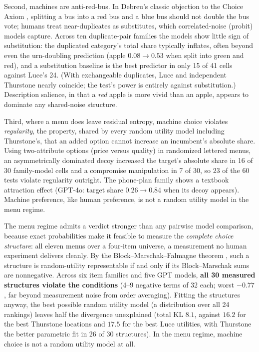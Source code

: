 \documentclass[11pt]{article}
\begin{document}
Second, machines are anti-red-bus. In Debreu's classic objection to the
Choice Axiom \cite{debreu1960}, splitting a bus into a red bus and a
blue bus should not double the bus vote; humans treat near-duplicates as
substitutes, which correlated-noise (probit) models capture. Across ten
duplicate-pair families the models show little sign of substitution:
the duplicated category's total share typically inflates, often beyond
even the urn-doubling prediction (apple $0.08 \to 0.53$ when split into
green and red), and a substitution baseline is the best predictor in
only 15 of 41 cells against Luce's 24. (With exchangeable duplicates,
Luce and independent Thurstone nearly coincide; the test's power is
entirely against substitution.) Description salience, in that a
\emph{red} apple is more vivid than an apple, appears to dominate any
shared-noise structure.

Third, where a menu does leave residual entropy, machine choice violates
\emph{regularity}, the property, shared by every random utility model
including Thurstone's, that an added option cannot increase an incumbent's
absolute share. Using two-attribute options (price versus quality) in
randomized lettered menus, an asymmetrically dominated decoy
\cite{huber1982} increased the target's absolute share in 16 of 30
family-model cells and a compromise manipulation \cite{simonson1989} in 7 of
30, so 23 of the 60 tests violate regularity outright. The phone-plan family shows a textbook attraction effect
(GPT-4o: target share $0.26 \to 0.84$ when its decoy
appears). Machine preference, like human preference, is not a random
utility model in the menu regime.

The menu regime admits a verdict stronger than any pairwise model
comparison, because exact probabilities make it feasible to measure the
\emph{complete choice structure}: all eleven menus over a four-item
universe, a measurement no human experiment delivers cleanly. By the
Block--Marschak--Falmagne theorem \cite{block1960, falmagne1978}, such a
structure is random-utility representable if and only if its
Block--Marschak sums are nonnegative. Across six item families and five
GPT models, \textbf{all 30 measured structures violate the conditions}
(4--9 negative terms of 32 each; worst $-0.77$, far beyond measurement
noise from order averaging). Fitting the structures anyway, the best
possible random utility model (a distribution over all 24 rankings)
leaves half the divergence unexplained (total KL $8.1$, against $16.2$
for the best Thurstone locations and $17.5$ for the best Luce
utilities, with Thurstone the better parametric fit in 26 of 30
structures). In the menu regime, machine choice is not a random utility
model at all.
\end{document}
